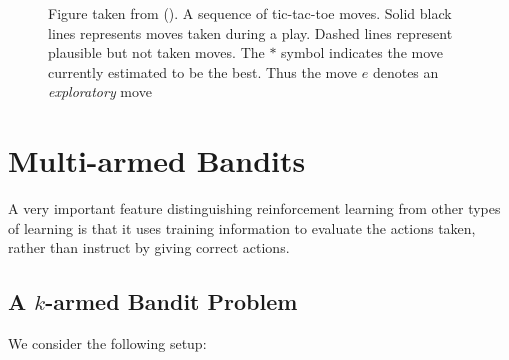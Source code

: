 \documentclass[
  letterpaper,
]{krantz}
\theoremstyle{plain}
\theoremstyle{definition}
\theoremstyle{definition}
\theoremstyle{remark}
\begin{document}
\begin{figure}


\caption{\label{fig-tic_tac_toc_diag}Figure taken from
(). A sequence of
tic-tac-toe moves. Solid black lines represents moves taken during a
play. Dashed lines represent plausible but not taken moves. The \(*\)
symbol indicates the move currently estimated to be the best. Thus the
move \(e\) denotes an \emph{exploratory} move}

\end{figure}%


\chapter{Multi-armed Bandits}\label{multi-armed-bandits}

A very important feature distinguishing reinforcement learning from
other types of learning is that it uses training information to evaluate
the actions taken, rather than instruct by giving correct actions.

\section{\texorpdfstring{A \(k\)-armed Bandit
Problem}{A k-armed Bandit Problem}}\label{a-k-armed-bandit-problem}

We consider the following setup:
\end{document}
